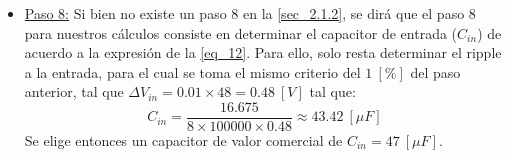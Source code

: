 \documentclass[12pt,a4paper]{article}
\begin{document}
\begin{itemize}
    
    \item \underline{Paso 8:} Si bien no existe un paso 8 en la \autoref{sec_2.1.2}, se dirá que el paso 8 para nuestros cálculos consiste en determinar el capacitor de entrada ($C_{in}$) de acuerdo a la expresión de la \autoref{eq_12}. Para ello, solo resta determinar el ripple a la entrada, para el cual se toma el mismo criterio del $1 \ [\%]$ del paso anterior, tal que $\Delta V_{in} = 0.01 \times 48 = 0.48 \ [V]$ tal que:
    \begin{equation}
        C_{in} = \frac{16.675}{8 \times 100000 \times 0.48} \approx 43.42 \ [\mu F]
        \label{eq_21}
    \end{equation}
    Se elige entonces un capacitor de valor comercial de $C_{in} = 47 \ [\mu F]$.
\end{itemize}
\end{document}
